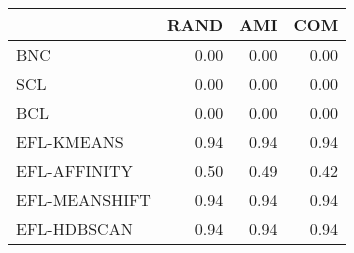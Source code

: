 \begin{tabular}{lrrr}
\toprule
 & RAND & AMI & COM \\
\midrule
BNC & 0.00 & 0.00 & 0.00 \\
SCL & 0.00 & 0.00 & 0.00 \\
BCL & 0.00 & 0.00 & 0.00 \\
EFL-KMEANS & 0.94 & 0.94 & 0.94 \\
EFL-AFFINITY & 0.50 & 0.49 & 0.42 \\
EFL-MEANSHIFT & 0.94 & 0.94 & 0.94 \\
EFL-HDBSCAN & 0.94 & 0.94 & 0.94 \\
\bottomrule
\end{tabular}
